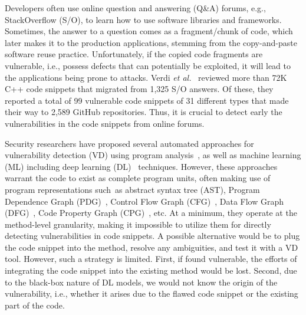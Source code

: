 

Developers often use online question and answering (Q\&A) forums,
e.g., StackOverflow (S/O), to learn how to use software libraries and
frameworks. Sometimes, the answer to a question comes as a
fragment/chunk of code, which later makes it to the production
applications, stemming from the copy-and-paste software reuse
practice. Unfortunately, if the copied code fragments are vulnerable,
i.e., possess defects that can potentially be exploited, it will lead
to the applications being prone to attacks. Verdi {\em et
  al.}~\cite{verdi-tse22} reviewed more than 72K C++ code snippets
that migrated from 1,325 S/O answers. Of these, they reported a total
of 99 vulnerable code snippets of 31 different types that made their
way to 2,589 GitHub repositories. Thus, it is crucial to detect early
the vulnerabilities in the code snippets from online forums.

Security researchers have proposed several automated approaches for
vulnerability detection (VD) using program
analysis~\cite{FlawFinder,RATS,viega2000its4,Checkmarx,HPFortify,Coverity,BufferOverFlow,SQLInj,Cross-siteScripting,AuthBypassSpoofing},
as well as machine learning (ML) including deep learning
(DL)~\cite{fse21,chakraborty2020deep,zhou2019devign,li2018sysevr,li2018vuldeepecker}
techniques. However, these approaches warrant the code to exist as
complete program units, often making use of program representations
such~as abstract syntax tree (AST), Program Dependence Graph
(PDG)~\cite{fse21,li2018vuldeepecker}, Control Flow Graph
(CFG)~\cite{zhou2019devign}, Data Flow Graph
(DFG)~\cite{zhou2019devign}, Code Property Graph
(CPG)~\cite{chakraborty2020deep}, etc. At a minimum, they operate at
the method-level granularity, making it impossible to utilize them for
directly detecting vulnerabilities in code snippets. A possible
alternative would be to plug the code snippet into the method, resolve
any ambiguities, and test it with a VD tool. However, such a strategy
is limited. First, if found vulnerable, the efforts of integrating the
code snippet into the existing method would be lost. Second, due to
the black-box
nature of DL models, we would not know the origin of the
vulnerability, i.e., whether it arises due to the flawed code snippet
or the existing part of the code.

